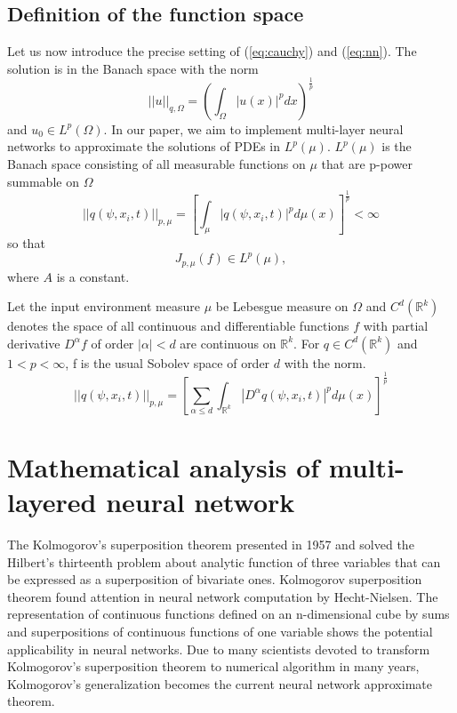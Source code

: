 \documentclass{article}
\begin{document}
		\subsection{Definition of the function space}
		Let us now introduce the precise setting of (\ref{eq:cauchy}) and (\ref{eq:nn}).
The solution is in the Banach space with the norm
		\begin{equation}
		||u||_{q,\Omega} = \left(\int_{\Omega} |u(x)|^{p} dx\right)^{\frac{1}{p}}
		\end{equation}
		and $u_{0} \in L^{p}(\Omega)$.
In our paper, we aim to implement multi-layer neural networks to approximate the solutions of PDEs in $L^{p}(\mu)$.
$L^{p}(\mu)$ is the Banach space consisting of all measurable functions on $\mu$ that are p-power summable on $\Omega$
		\begin{equation}
		||q(\psi,x_i,t)||_{p,\mu} = \left[\int_{\mu} |q(\psi,x_i,t)|^{p} d\mu(x)\right]^{\frac{1}{p}} < \infty
		\end{equation}
		so that
		\begin{equation}
		J_{p,\mu}(f)  \in L^{p}(\mu),
		\end{equation}
where $A$ is a constant.

		Let the input environment measure $\mu$ be Lebesgue measure on $\Omega$
and $C^{d}(\mathbb{R}^{k})$ denotes the space of all continuous
and differentiable functions $f$ with partial derivative $D^{\alpha}f$ of order $|\alpha| < d$ are continuous on $\mathbb{R}^{k}$.
For $q \in C^{d}(\mathbb{R}^{k})$ and $1 < p < \infty$, f is the usual Sobolev space of order $d$ with the norm.
		\begin{equation}
		||q(\psi,x_i,t)||_{p,\mu} = \left[ \sum_{\alpha \leq d} \int_{\mathbb{R}^{k}} |D^{\alpha}q(\psi,x_i,t)|^{p} d \mu(x)\right]^{\frac{1}{p}}
		\end{equation}



\section{Mathematical analysis of multi-layered neural network}
 The Kolmogorov's superposition theorem presented in 1957 and solved the Hilbert's thirteenth problem \footnotemark about analytic function of three variables that can be expressed as a superposition of bivariate ones.
Kolmogorov superposition theorem found attention in neural network computation by Hecht{-}Nielsen\cite{nielsen}.
The representation of continuous functions defined on an n{-}dimensional cube by sums and superpositions of continuous functions of one variable shows the potential applicability in neural networks\cite{kurkova}.
Due to many scientists devoted to transform Kolmogorov's superposition theorem to numerical algorithm in many years,
Kolmogorov's generalization becomes the current neural network approximate theorem.
\end{document}
